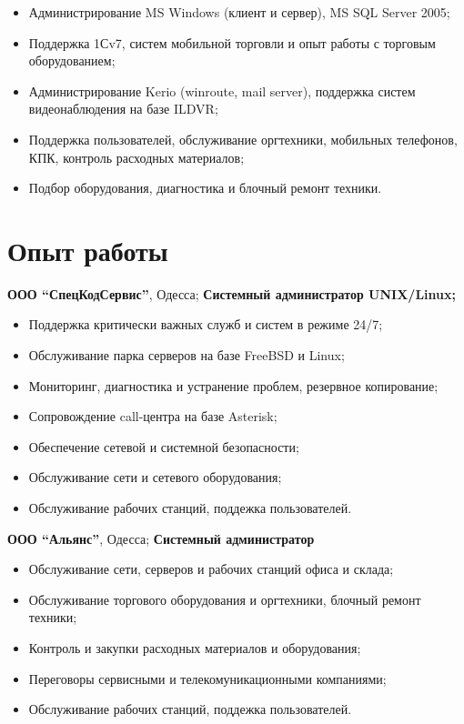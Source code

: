 \documentclass[12pt,a4paper,serif]{moderncv}
\begin{document}
			{\begin{itemize}
				\item Администрирование MS Windows (клиент и сервер), MS SQL Server 2005;
			  	\item Поддержка 1Сv7, систем мобильной торговли и опыт работы с торговым
			  оборудованием;
			  	\item Администрирование Kerio (winroute, mail server), поддержка систем
			  видеонаблюдения на базе ILDVR;
			  	\item Поддержка пользователей, обслуживание оргтехники, мобильных
			  телефонов, КПК, контроль расходных материалов;
			  	\item Подбор оборудования, диагностика и блочный ремонт техники.
			\end{itemize}}

	\section{Опыт работы}
			{\textbf{ООО ``СпецКодСервис''}, Одесса;
			\newline\textbf{Системный администратор	UNIX/Linux;}
			\begin{itemize}
				\item Поддержка критически важных служб и систем в режиме 24/7;
			    \item Обслуживание парка серверов на базе FreeBSD и Linux;
			    \item Мониторинг, диагностика и устранение проблем, резервное
			    копирование;
			    \item Сопровождение call-центра на базе Asterisk;
			    \item Обеспечение сетевой и системной безопасности;
			    \item Обслуживание сети и сетевого оборудования;
			    \item Обслуживание рабочих станций, поддежка пользователей.
			\end{itemize}}
			{\textbf{ООО ``Альянс''}, Одесса;
			\newline\textbf{Системный администратор}
			\begin{itemize}
			    \item Обслуживание сети, серверов и рабочих станций офиса
			    и склада;
			    \item Обслуживание торгового оборудования и оргтехники, блочный ремонт
			    техники;
			    \item Контроль и закупки расходных материалов и оборудования;
			    \item Переговоры сервисными и телекомуникационными компаниями;
			    \item Обслуживание рабочих станций, поддежка пользователей.
			\end{itemize}}
\end{document}
